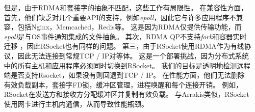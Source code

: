 但是，由于RDMA和套接字的抽象不匹配，这些工作有局限性。
在兼容性方面，首先，他们缺乏对几个重要API的支持，例如\textit {epoll}，因此它与许多应用程序不兼容，包括Nginx，Memcached，Redis等。
这是因为RDMA仅提供传输功能，而\textit {epoll}是与OS事件通知集成的文件抽象。
其次，RDMA QP不支持\textit {fork}和容器实时迁移 \cite{nsdi19freeflow}，因此RSocket也有同样的问题。
第三，由于RSocket使用RDMA作为有线协议，因此无法连接到常规TCP / IP对等体。
这是一个部署挑战，因为分布式系统中的所有主机和应用程序必须同时切换到RSocket。
我们的目标是透明地检测远程端是否支持Rsocket，如果没有则回退到TCP / IP。
在性能方面，他们无法删除有效负载副本，套接字FD锁，缓冲区管理，进程唤醒和每个连接开销。
例如，RSocket在发送方和接收方分配缓冲区并复制有效负载。
与Arrakis类似，RSocket使用网卡进行主机内通信，从而导致性能瓶颈。





